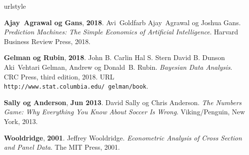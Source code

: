 
%

\begin{thebibliography}{}
\providecommand{\natexlab}[1]{#1}
\providecommand{\url}[1]{\texttt{#1}}
\expandafter\ifx\csname urlstyle\endcsname\relax
  \providecommand{\doi}[1]{doi: #1}\else
  \providecommand{\doi}{doi: \begingroup \urlstyle{rm}\Url}\fi

\textbf{Ajay~Agrawal og Gans}, \textbf{2018}.
\newblock Avi~Goldfarb Ajay~Agrawal og Joshua Gans.
\newblock \textit{Prediction Machines: The Simple Economics of Artificial
  Intelligence}.
\newblock Harvard Business Review Press, 2018.

\textbf{Gelman og Rubin}, \textbf{2018}.
\newblock John B. Carlin Hal S. Stern David B. Dunson Aki~Vehtari Gelman,
  Andrew og Donald~B. Rubin.
\newblock \textit{Bayesian Data Analysis}.
\newblock CRC Press, third edition, 2018.
\newblock URL \url{http://www.stat.columbia.edu/~gelman/book}.

\textbf{Sally og Anderson}, \textbf{Jun 2013}.
\newblock David Sally og Chris Anderson.
\newblock \textit{The Numbers Game: Why Everything You Know About Soccer Is
  Wrong}.
\newblock Viking/Penguin, New York, 2013.

\textbf{Wooldridge}, \textbf{2001}.
\newblock Jeffrey Wooldridge.
\newblock \textit{Econometric Analysis of Cross Section and Panel Data}.
\newblock The MIT Press, 2001.

\end{thebibliography}





